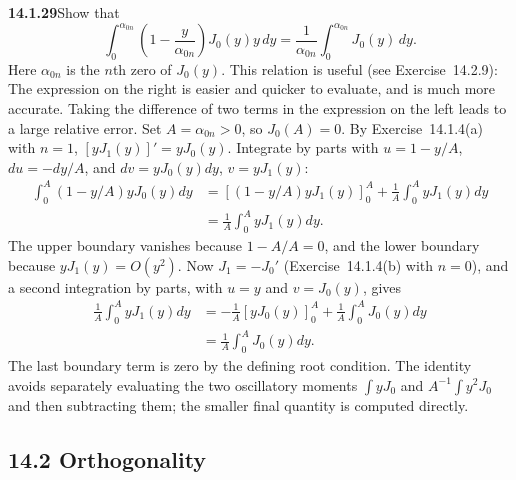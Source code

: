 \par\bigskip
\noindent\textbf{14.1.29}\quad Show that
\[
\int_{0}^{\alpha_{0n}}\left(1-\frac{y}{\alpha_{0n}}\right)J_{0}(y)y\,dy
=\frac{1}{\alpha_{0n}}\int_{0}^{\alpha_{0n}}J_{0}(y)\,dy.
\]
Here $\alpha_{0n}$ is the $n$th zero of $J_{0}(y)$. This relation is
useful (see Exercise~14.2.9): The expression on the right is easier
and quicker to evaluate, and is much more accurate. Taking the
difference of two terms in the expression on the left leads to a large
relative error.
\solution
Set $A=\alpha_{0n}>0$, so $J_0(A)=0$. By Exercise~14.1.4(a) with
$n=1$, $[yJ_1(y)]'=yJ_0(y)$. Integrate by parts with
$u=1-y/A$, $du=-dy/A$, and $dv=yJ_0(y)dy$, $v=yJ_1(y)$:
\begin{align*}
\int_0^A(1-y/A)yJ_0(y)dy
&=\left[(1-y/A)yJ_1(y)\right]_0^A
+\frac1A\int_0^A yJ_1(y)dy\\
&=\frac1A\int_0^A yJ_1(y)dy.
\end{align*}
The upper boundary vanishes because $1-A/A=0$, and the lower
boundary because $yJ_1(y)=O(y^2)$. Now $J_1=-J_0'$ (Exercise~14.1.4(b)
with $n=0$), and a second integration by parts, with $u=y$ and
$v=J_0(y)$, gives
\begin{align*}
\frac1A\int_0^A yJ_1(y)dy
&=-\frac1A[yJ_0(y)]_0^A+\frac1A\int_0^A J_0(y)dy\\
&=\boxed{\frac1A\int_0^A J_0(y)dy}.
\end{align*}
The last boundary term is zero by the defining root condition.
The identity avoids separately evaluating the two oscillatory
moments $\int yJ_0$ and $A^{-1}\int y^2J_0$ and then subtracting
them; the smaller final quantity is computed directly.

\subsection*{14.2 Orthogonality}

